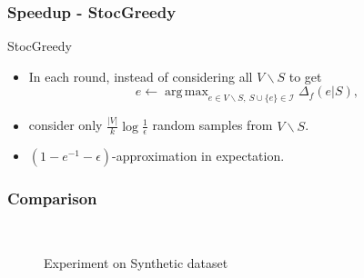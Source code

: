 \documentclass{beamer}
\newcommand{\calI}{\mathcal{I}}
\DeclareMathOperator*{\argmax}{arg\,max}
\begin{document}
\begin{frame}
\frametitle{Speedup - {\sc StocGreedy}\cite{MBK+15}}
 \begin{block}{StocGreedy}
   \begin{itemize}
   \item<1,2,3> In each round, instead of considering all $V\backslash S$  to get
     $$e \gets \argmax_{e\in V\backslash S, ~S\cup\{e\}\in \calI} \Delta_f(e|S),$$
    \item<2,3>   consider only $\frac{|V|}{k}\log\frac{1}{\epsilon}$ random samples from $V \backslash S$.
    \item<3> $(1 - e^{-1}-\epsilon)$-approximation in expectation.
   \end{itemize}
\end{block}
 \end{frame}



 \begin{frame}
   \frametitle{Comparison}
\begin{figure}[h!t]
     \centering
     ~~
     \caption{Experiment on {\sc Synthetic} dataset}
     \label{fig:sythetic-offline}
   \end{figure}
 \end{frame}
\end{document}
